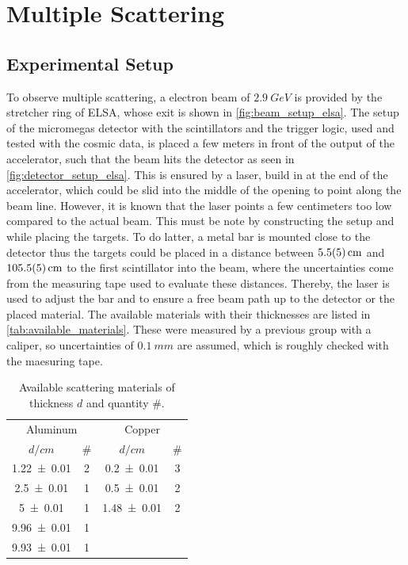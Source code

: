 \documentclass[sn-mathphys-num,iicol]{sn-jnl}
\theoremstyle{thmstyleone}
\theoremstyle{thmstyletwo}
\theoremstyle{thmstylethree}
\begin{document}

\section{Multiple Scattering}
\subsection{Experimental Setup}
To observe multiple scattering, a electron beam of $\SI{2.9}{GeV}$ is provided by the stretcher ring of ELSA, whose exit is shown in \autoref{fig:beam_setup_elsa}. The setup of the micromegas detector with the scintillators and the trigger logic, used and tested with the cosmic data, is placed a few meters in front of the output of the accelerator, such that the beam hits the detector as seen in \autoref{fig:detector_setup_elsa}. This is ensured by a laser, build in at the end of the accelerator, which could be slid into the middle of the opening to point along the beam line. However, it is known that the laser points a few centimeters too low compared to the actual beam. This must be note by constructing the setup and while placing the targets.
To do latter, a metal bar is mounted close to the detector thus the targets could be placed in a distance between $\SI{5.5\pm 0.5}{cm}$ and $\SI{105.5\pm 0.5}{cm}$ to the first scintillator into the beam, where the uncertainties come from the measuring tape used to evaluate these distances. Thereby, the laser is used to adjust the bar and to ensure a free beam path up to the detector or the placed material.
The available materials with their thicknesses are listed in \autoref{tab:available_materials}. These were measured by a previous group with a caliper, so uncertainties of $\SI{0.1}{mm}$ are assumed, which is roughly checked with the maesuring tape.


\begin{table}\centering
  \renewcommand*{\arraystretch}{1.1}
  \begin{tabular}{c|c||c|c}
    \multicolumn{2}{c||}{Aluminum} & \multicolumn{2}{c}{Copper} \\
    {\fontsize{8}{3}\selectfont $d/\si{cm}$} & {\fontsize{8}{3}\selectfont \#} & {\fontsize{8}{3}\selectfont $d/\si{cm}$} & {\fontsize{8}{3}\selectfont \# } \\\hline \rule{0pt}{3ex}
    \num{1.22\pm 0.01} & 2 & \num{0.2\pm 0.01} & 3 \\
    \num{2.5\pm 0.01} & 1 & \num{0.5\pm 0.01} & 2 \\
    \num{5\pm 0.01} & 1 & \num{1.48\pm 0.01} & 2 \\
    \num{9.96\pm 0.01} & 1 & & \\
    \num{9.93\pm 0.01} & 1 & & \\
  \end{tabular}\vspace{3mm}
  \caption{Available scattering materials of thickness $d$ and quantity $\#$.}
  \label{tab:available_materials}
\end{table}
\end{document}
